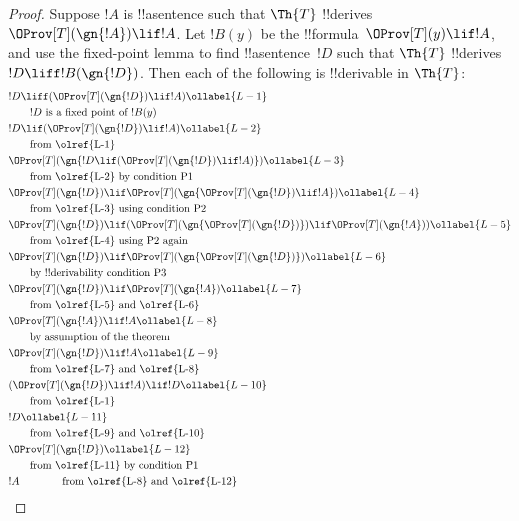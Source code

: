 \documentclass[../../../include/open-logic-section]{subfiles}
\begin{document}
\begin{proof}
Suppose $!A$ is !!a{sentence} such that $\Th{T}$ !!{derive}s
$\OProv[T](\gn{!A}) \lif !A$. Let $!B(y)$ be the !!{formula}~$\OProv[T](y)
\lif !A$, and use the fixed-point lemma to find !!a{sentence}~$!D$
such that $\Th{T}$ !!{derive}s $!D \liff !B(\gn{!D})$. Then each of the
following is !!{derivable} in $\Th{T}$:
\begin{align}
  & !D \liff (\OProv[T](\gn{!D}) \lif !A) \ollabel{L-1}\\
  & \qquad \text{$!D$ is a fixed point of~$!B(y)$}\notag \\
  & !D \lif (\OProv[T](\gn{!D}) \lif !A) \ollabel{L-2}\\
  & \qquad\text{from \olref{L-1}}\notag\\
  & \OProv[T](\gn{!D \lif (\OProv[T](\gn{!D}) \lif !A)}) \ollabel{L-3}\\
  & \qquad \text{from \olref{L-2} by condition P1}\notag \\
  & \OProv[T](\gn{!D}) \lif \OProv[T](\gn{\OProv[T](\gn{!D}) \lif !A})
  \ollabel{L-4}\\
  &\qquad \text{from \olref{L-3} using condition P2}\notag \\
  & \OProv[T](\gn{!D}) \lif (\OProv[T](\gn{\OProv[T](\gn{!D})}) \lif \OProv[T](\gn{!A})) \ollabel{L-5}\\
  &\qquad \text{from \olref{L-4} using P2 again} \notag\\
& \OProv[T](\gn{!D}) \lif \OProv[T](\gn{\OProv[T](\gn{!D})}) \ollabel{L-6}\\
  & \qquad\text{by !!{derivability} condition P3} \notag\\
  & \OProv[T](\gn{!D}) \lif \OProv[T](\gn{!A}) \ollabel{L-7} \\
  &\qquad\text{from \olref{L-5} and \olref{L-6}}\notag\\
  & \OProv[T](\gn{!A}) \lif !A \ollabel{L-8}\\
  &\qquad\text{by assumption of the theorem} \notag\\
  & \OProv[T](\gn{!D}) \lif !A \ollabel{L-9}\\
  &\qquad\text{from \olref{L-7} and \olref{L-8}}\notag\\
  & (\OProv[T](\gn{!D}) \lif !A) \lif !D \ollabel{L-10}\\
  & \qquad \text{from \olref{L-1}}\notag \\
  & !D \ollabel{L-11}\\
  & \qquad\text{from \olref{L-9} and \olref{L-10}}\notag \\
  & \OProv[T](\gn{!D}) \ollabel{L-12}\\
  & \qquad\text{from \olref{L-11} by condition~P1}\notag \\
  & !A \qquad\qquad\text{from \olref{L-8} and \olref{L-12}}\notag
\end{align}
\end{proof}
\end{document}
